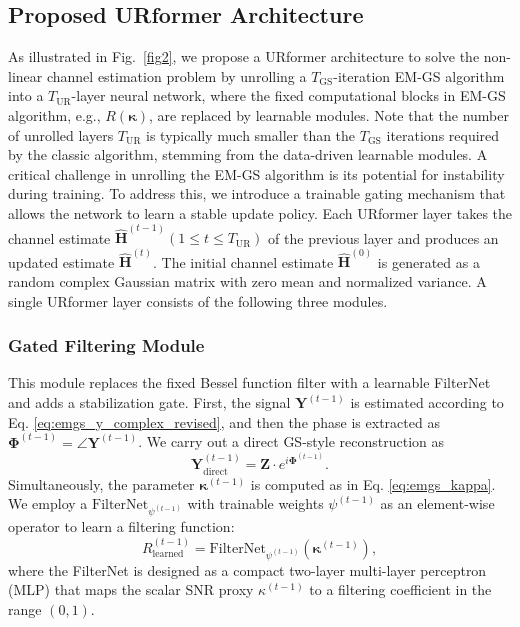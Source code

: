 \documentclass[journal]{IEEEtran}
\newcommand{\mat}[1]{\boldsymbol{#1}}
\begin{document}
\subsection{Proposed URformer Architecture}
As illustrated in Fig.~\ref{fig2}, we propose a URformer architecture to solve the non-linear channel estimation problem by unrolling a $T_\text{GS}$-iteration EM-GS algorithm into a $T_\text{UR}$-layer neural network, where the fixed computational blocks in EM-GS algorithm, e.g., $R(\boldsymbol{\kappa})$, are replaced by learnable modules. Note that the number of unrolled layers $T_\text{UR}$ is typically much smaller than the $T_\text{GS}$ iterations required by the classic algorithm, stemming from the data-driven learnable modules. A critical challenge in unrolling the EM-GS algorithm is its potential for instability during training. To address this, we introduce a trainable gating mechanism that allows the network to learn a stable update policy. Each URformer layer takes the channel estimate $\hat{\mathbf{H}}^{(t-1)} (1\le t \le T_\text{UR})$ of the previous layer and produces an updated estimate $\hat{\mathbf{H}}^{(t)}$. The initial channel estimate $\hat{\mathbf{H}}^{(0)}$ is generated as a random complex Gaussian matrix with zero mean and normalized variance. A single URformer layer consists of the following three modules.

\subsubsection{Gated Filtering Module} This module replaces the fixed Bessel function filter with a learnable FilterNet and adds a stabilization gate. First, the signal $\mathbf{Y}^{(t-1)} $ is estimated according to Eq. \eqref{eq:emgs_y_complex_revised}, and then the phase is extracted as $\mathbf{\Phi}^{(t-1)}  = \angle \mathbf{Y}^{(t-1)} $. We carry out a direct GS-style reconstruction as
\begin{equation}
    \mathbf{Y}_{\text{direct}}^{(t-1)}  = \mathbf{Z} {\cdot} e^{i\mat{\Phi}^{(t-1)} }.
    \label{eq:l_emgs_y_direct}
\end{equation}
Simultaneously, the parameter $\mathbf{\boldsymbol{\kappa}}^{(t-1)} $ is computed as in Eq. \eqref{eq:emgs_kappa}. We employ a $\text{FilterNet}_{{\psi}^{(t-1)}} $ with trainable weights ${\psi}^{(t-1)} $ as an element-wise operator to learn a filtering function:
\begin{equation}
    R_{\text{learned}}^{(t-1)}  = \text{FilterNet}_{{\psi}^{(t-1)}} (\mathbf{\boldsymbol{\kappa}}^{(t-1)} ), 
    \label{eq:l_emgs_r_learned}
\end{equation}
where the FilterNet is designed as a compact two-layer multi-layer perceptron (MLP) that maps the scalar SNR proxy $\kappa^{(t-1)} $ to a filtering coefficient in the range $(0, 1)$.
\end{document}
